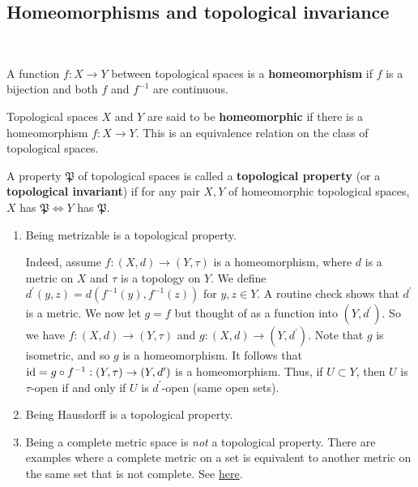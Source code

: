 \documentclass[a4paper]{article}
\begin{document}
\subsection{Homeomorphisms and topological invariance}\ \vspace{-1.5em}
\begin{definition}
    A function $f: X \rightarrow Y$ between topological spaces is a \textbf{homeomorphism} if $f$ is a bijection and both $f$ and $f^{-1}$ are continuous.

    Topological spaces $X$ and $Y$ are said to be \textbf{homeomorphic} if there is a homeomorphism $f: X \rightarrow Y$. This is an equivalence relation on the class of topological spaces.

    A property $\mathfrak{P}$ of topological spaces is called a \textbf{topological property} (or a \textbf{topological invariant}) if for any pair $X, Y$ of homeomorphic topological spaces, $X$ has $\mathfrak{P} \Longleftrightarrow Y$ has $\mathfrak{P}$. 
\end{definition}

\begin{example}
    \begin{enumerate}
        \item Being metrizable is a topological property.
        
        Indeed, assume $f:(X, d) \rightarrow(Y, \tau)$ is a homeomorphism, where $d$ is a metric on $X$ and $\tau$ is a topology on $Y$. We define $d^{\prime}(y, z)=d\left(f^{-1}(y), f^{-1}(z)\right)$ for $y, z \in Y$. A routine check shows that $d^{\prime}$ is a metric. We now let $g=f$ but thought of as a function into $\left(Y, d^{\prime}\right)$. So we have $f:(X, d) \rightarrow(Y, \tau)$ and $g:(X, d) \rightarrow\left(Y, d^{\prime}\right)$. Note that $g$ is isometric, and so $g$ is a homeomorphism. It follows that $\operatorname{id}=g \circ f^{-1}:(Y, \tau) \rightarrow\left(Y, d^{\prime}\right)$ is a homeomorphism. Thus, if $U \subset Y$, then $U$ is $\tau$-open if and only if $U$ is $d^{\prime}$-open (same open sets).
        \begin{center}
        \end{center}
        \item Being Hausdorff is a topological property.
        \item Being a complete metric space is \textit{not} a topological property. There are examples where a complete metric on a set is equivalent to another metric on the same set that is not complete. See \href{https://math.stackexchange.com/questions/1565350/why-is-completeness-not-a-topological-property}{here}.
      \end{enumerate}
\end{example}
\end{document}
